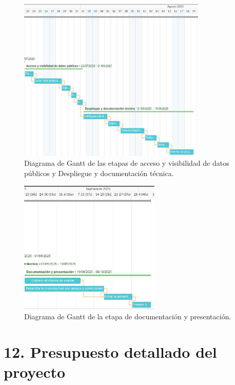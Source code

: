 \documentclass[
11pt, %
]{charter}
\begin{document}
\begin{figure}[htpb]
\centering 
\includegraphics[width=0.8\textwidth]{./Figuras/fig_8-1-Gantt.jpeg}
\caption{Diagrama de Gantt de las etapas de acceso y visibilidad de datos públicos y Despliegue y documentación técnica.}
\label{fig:AoN}
\end{figure}



\begin{figure}[htpb]
\centering 
\includegraphics[width=0.6\textwidth]{./Figuras/fig_9-1-Gantt.jpeg}
\caption{Diagrama de Gantt de la etapa de documentación y presentación.}
\label{fig:AoN}
\end{figure}



\section{12. Presupuesto detallado del proyecto}
\label{sec:presupuesto}
\end{document}
